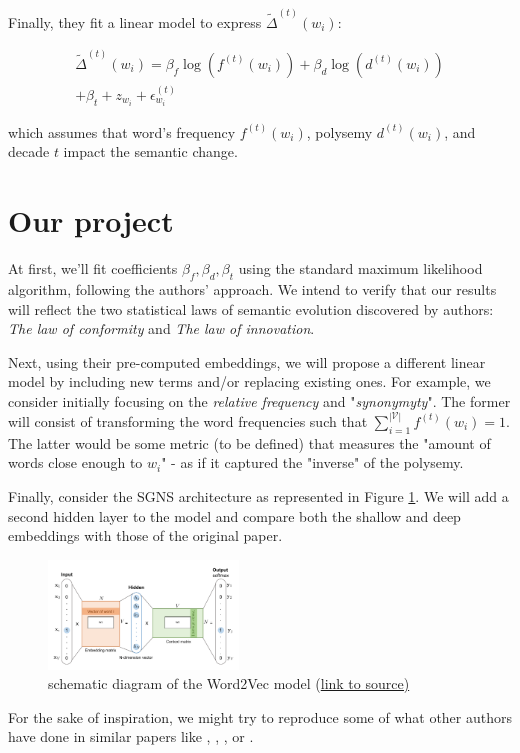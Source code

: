 \documentclass[11pt, twocolumn]{extarticle}
\newcommand{\word}[1]{w_{#1}}
\newcommand{\freq}[2]{f^{(#2)}(w_{#1})}
\begin{document}
Finally, they fit a linear model to express \(\tilde{\Delta}^{( t )} ( w_i )\):

\begin{gather*}
\tilde{\Delta}^{( t )} ( w_i ) = \beta_f \log \left( f^{( t )} ( w_i ) \right) +\beta_d \log \left( d^{( t ) } ( w_i ) \right) \\
+ \beta_{t} + z_{w_i} + \epsilon_{w_i}^{( t ) }
\end{gather*} 

which assumes that word's frequency \(f^{( t )} ( w_i )\), polysemy \(d^{( t ) } ( w_i )\), and decade \(t\) impact the semantic change. 

\section{Our project}

At first, we'll fit coefficients \(\beta_f, \beta_d, \beta_t\) using the standard maximum likelihood algorithm, following the authors' approach. We intend to verify that our results will reflect the two statistical laws of semantic evolution discovered by authors: \textit{The law of conformity} and \textit{The law of innovation}.
\par

Next, using their pre-computed embeddings, we will propose a different linear model by including new terms and/or replacing existing ones. For example, we consider initially focusing on the \textit{relative frequency} and "\textit{synonymyty}". The former will consist of transforming the word frequencies such that $\sum^{|\mathcal{V}|}_{i=1} \freq{i}{t} = 1$. The latter would be some metric (to be defined) that measures the "amount of words close enough to $\word{i}$" - as if it captured the "inverse" of the polysemy.
\par

Finally, consider the SGNS architecture as represented in Figure \ref{word2vec-schematic}. We will add a second hidden layer to the model and compare both the shallow and deep embeddings with those of the original paper.

\begin{figure}[H]
    \centering
    \includegraphics[width=0.45\textwidth]{word2vec.png}
    \caption{
        \label{word2vec-schematic}
        schematic diagram of the Word2Vec model (\href{https://lilianweng.github.io/lil-log/2017/10/15/learning-word-embedding.html}{link to source)}
    }
\end{figure}

For the sake of inspiration, we might try to reproduce some of what other authors have done in similar papers like \cite{dubossarsky-etal-2017-outta},  \cite{dynamic-word-embeddings}, \cite{carlo2019training}, or \cite{delpech2018unsupervised}.



\end{document}
